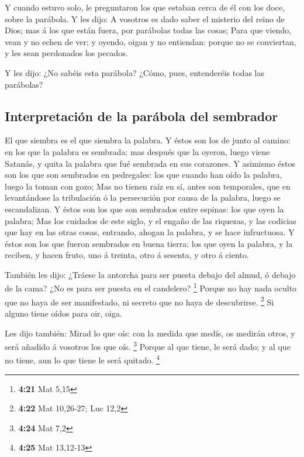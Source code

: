  Y cuando estuvo solo, le preguntaron los que estaban
cerca de él con los doce, sobre la parábola.  Y les dijo:
A vosotros es dado saber el misterio del reino de Dios; mas á los que
están fuera, por parábolas todas las cosas;  Para que
viendo, vean y no echen de ver; y oyendo, oigan y no entiendan: porque
no se conviertan, y les sean perdonados los pecados.

 Y les dijo: ¿No sabéis esta parábola? ¿Cómo, pues,
entenderéis todas las parábolas?

\hypertarget{interpretaciuxf3n-de-la-paruxe1bola-del-sembrador}{%
\subsection{Interpretación de la parábola del
sembrador}\label{interpretaciuxf3n-de-la-paruxe1bola-del-sembrador}}

 El que siembra es el que siembra la palabra.
 Y éstos son los de junto al camino: en los que la
palabra es sembrada: mas después que la oyeron, luego viene Satanás, y
quita la palabra que fué sembrada en sus corazones.  Y
asimismo éstos son los que son sembrados en pedregales: los que cuando
han oído la palabra, luego la toman con gozo;  Mas no
tienen raíz en sí, antes son temporales, que en levantándose la
tribulación ó la persecución por causa de la palabra, luego se
escandalizan.  Y éstos son los que son sembrados entre
espinas: los que oyen la palabra;  Mas los cuidados de
este siglo, y el engaño de las riquezas, y las codicias que hay en las
otras cosas, entrando, ahogan la palabra, y se hace infructuosa.
 Y éstos son los que fueron sembrados en buena tierra:
los que oyen la palabra, y la reciben, y hacen fruto, uno á treinta,
otro á sesenta, y otro á ciento.

 También les dijo: ¿Tráese la antorcha para ser puesta
debajo del almud, ó debajo de la cama? ¿No es para ser puesta en el
candelero? \footnote{\textbf{4:21} Mat 5,15}  Porque no
hay nada oculto que no haya de ser manifestado, ni secreto que no haya
de descubrirse. \footnote{\textbf{4:22} Mat 10,26-27; Luc 12,2}
 Si alguno tiene oídos para oir, oiga.

 Les dijo también: Mirad lo que oís: con la medida que
medís, os medirán otros, y será añadido á vosotros los que oís.
\footnote{\textbf{4:24} Mat 7,2}  Porque al que tiene, le
será dado; y al que no tiene, aun lo que tiene le será quitado.
\footnote{\textbf{4:25} Mat 13,12-13}

